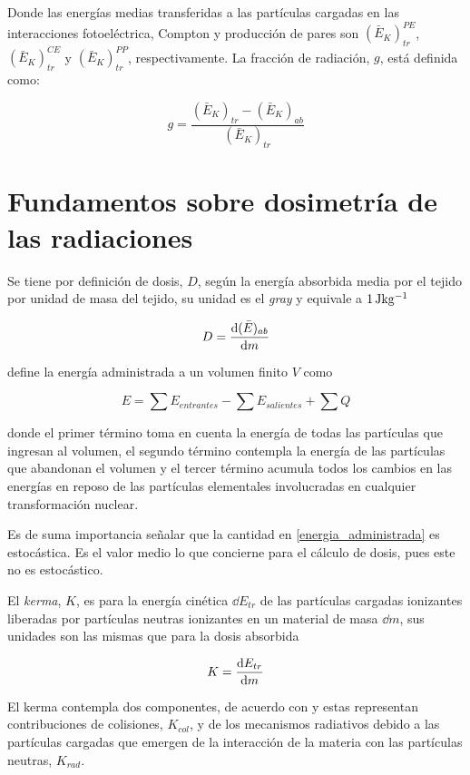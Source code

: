 \documentclass[12pt,letterpaper, oneside]{book}
\begin{document}
	 Donde las energías medias transferidas a las partículas cargadas en las interacciones fotoeléctrica, Compton y producción de pares son $\left(\bar{E}_K\right)_{tr}^{PE}$, $\left(\bar{E}_K\right)_{tr}^{CE}$ y  $\left(\bar{E}_K\right)_{tr}^{PP}$, respectivamente. La fracción de radiación, $g$, está definida como:
	 
	 $$g=\frac{\left(\bar{E}_K\right)_{tr}-\left(\bar{E}_K\right)_{ab}}{\left(\bar{E}_K\right)_{tr}}$$
	 
	\section{Fundamentos sobre dosimetría de las radiaciones}
	Se tiene por definición de dosis, $D$, según \cite{Mayles.2007} la energía absorbida media por el tejido por unidad de masa del tejido, su unidad es el \textit{gray} y equivale a $\unit[1]{Jkg^{-1}}$
	
	$$D=\dv{(\bar{E})_{ab}}{m}$$
	
	\cite{Mayles.2007} define la energía administrada a un volumen finito $V$ como 
	
	\begin{equation}
	E = \sum E_{entrantes} - \sum E_{salientes} + \sum Q\label{energia_administrada}
	\end{equation}
	
	donde el primer término toma en cuenta la energía de todas las partículas que ingresan al volumen, el segundo término contempla la energía de las partículas que abandonan el volumen y el tercer término acumula todos los cambios en las energías en reposo de las partículas elementales involucradas en cualquier transformación nuclear. 
	
	Es de suma importancia señalar que la cantidad en \ref{energia_administrada} es estocástica. Es el valor medio lo que concierne para el cálculo de dosis, pues este no es estocástico.
	
	El \textit{kerma}, $K$, es para \cite{Mayles.2007} la energía cinética $\dd{E_{tr}}$ de las partículas cargadas ionizantes liberadas por partículas neutras ionizantes en un material de masa $\dd{m}$, sus unidades son las mismas que para la dosis absorbida
	
	$$K=\dv{E_{tr}}{m}$$
	
	El kerma contempla dos componentes, de acuerdo con \cite{Mayles.2007} y \cite{IAEA.2005} estas representan contribuciones de colisiones, $K_{col}$, y de los mecanismos radiativos debido a las partículas cargadas que emergen de la interacción de la materia con las partículas neutras, $K_{rad}$. 
	
\end{document}
